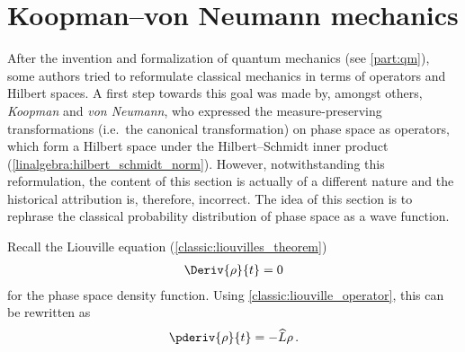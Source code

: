 
\section{Koopman--von Neumann mechanics}

    After the invention and formalization of quantum mechanics (see \cref{part:qm}), some authors tried to reformulate classical mechanics in terms of operators and Hilbert spaces. A first step towards this goal was made by, amongst others, \textit{Koopman} and \textit{von Neumann}, who expressed the measure-preserving transformations (i.e.~the canonical transformation) on phase space as operators, which form a Hilbert space under the Hilbert--Schmidt inner product (\cref{linalgebra:hilbert_schmidt_norm}). However, notwithstanding this reformulation, the content of this section is actually of a different nature and the historical attribution is, therefore, incorrect. The idea of this section is to rephrase the classical probability distribution of phase space as a wave function.

    Recall the Liouville equation (\cref{classic:liouvilles_theorem})
    \begin{gather}
        \Deriv{\rho}{t}=0
    \end{gather}
    for the phase space density function. Using \cref{classic:liouville_operator}, this can be rewritten as
    \begin{gather}
        \pderiv{\rho}{t} = -\widehat{L}\rho\,.
    \end{gather}

